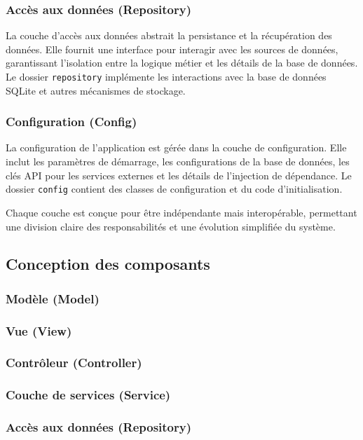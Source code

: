 \documentclass{article}
\begin{document}
\subsubsection{Accès aux données (Repository)}
La couche d'accès aux données abstrait la persistance et la récupération des données. Elle fournit une interface pour interagir avec les sources de données, garantissant l'isolation entre la logique métier et les détails de la base de données. Le dossier \texttt{repository} implémente les interactions avec la base de données SQLite et autres mécanismes de stockage.

\subsubsection{Configuration (Config)}
La configuration de l'application est gérée dans la couche de configuration. Elle inclut les paramètres de démarrage, les configurations de la base de données, les clés API pour les services externes et les détails de l'injection de dépendance. Le dossier \texttt{config} contient des classes de configuration et du code d'initialisation.

Chaque couche est conçue pour être indépendante mais interopérable, permettant une division claire des responsabilités et une évolution simplifiée du système.


\subsection{Conception des composants}

\subsubsection{Modèle (Model)}

\subsubsection{Vue (View)}

\subsubsection{Contrôleur (Controller)}

\subsubsection{Couche de services (Service)}

\subsubsection{Accès aux données (Repository)}
\end{document}
